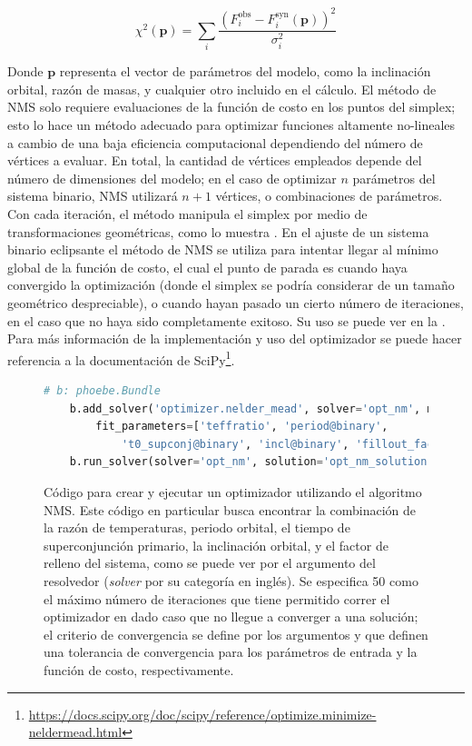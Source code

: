 \begin{eqfloat}[!ht]
	\centering
	\begin{equation}
		\chi^2(\textbf{p}) = \sum_{i}{\frac{\left(F_{i}^{\textrm{obs}} - F^{\textrm{syn}}_i(\textbf{p})\right)^2}{\sigma_{i}^2}}
	\end{equation}
	\blankcaption
	\label{ecuacionChi2Params}
\end{eqfloat}

Donde $\mathbf{p}$ representa el vector de parámetros del modelo, como la
inclinación orbital, razón de masas, y cualquier otro incluido en el cálculo. El
método de NMS solo requiere evaluaciones de la función de costo en los puntos
del simplex; esto lo hace un método adecuado para optimizar funciones altamente
no-lineales a cambio de una baja eficiencia computacional 
dependiendo del número de vértices a evaluar. En total, la cantidad
de vértices empleados depende del número de dimensiones del modelo; en el caso
de optimizar $n$ parámetros del sistema binario, NMS utilizará $n+1$ vértices, o
combinaciones de parámetros. Con cada iteración, el método manipula el simplex
por medio de transformaciones geométricas, como lo muestra
. En el ajuste de un sistema
binario eclipsante el método de NMS se utiliza para intentar llegar al mínimo
global de la función de costo, el cual el punto de parada es cuando haya
convergido la optimización (donde el simplex se podría considerar de un tamaño
geométrico despreciable), o cuando hayan pasado un cierto número de iteraciones,
en el caso que no haya sido completamente exitoso. Su uso se puede ver en la
. Para más información de la implementación y uso
del optimizador se puede hacer referencia a la documentación de
SciPy\footnote{\url{https://docs.scipy.org/doc/scipy/reference/optimize.minimize-neldermead.html}}.

\begin{figure}[!ht]
	\centering
	\begin{lstlisting}[language=Python, autogobble]
	# b: phoebe.Bundle
	b.add_solver('optimizer.nelder_mead', solver='opt_nm', maxiter=50,
		fit_parameters=['teffratio', 'period@binary', 
			't0_supconj@binary', 'incl@binary', 'fillout_factor'])
	b.run_solver(solver='opt_nm', solution='opt_nm_solution')
	\end{lstlisting}
	\caption{Código para crear y ejecutar un optimizador utilizando el algoritmo
	NMS. Este código en particular busca encontrar la combinación de la razón de
	temperaturas, periodo orbital, el tiempo de superconjunción primario, la
	inclinación orbital, y el factor de relleno del sistema, como se puede ver
	por el argumento  del resolvedor (\textit{solver} por
	su categoría en inglés). Se especifica 50 como el máximo número de
	iteraciones que tiene permitido correr el optimizador en dado caso que no
	llegue a converger a una solución; el criterio de convergencia se define por
	los argumentos  y  que definen una tolerancia de
	convergencia para los parámetros de entrada y la función de costo,
	respectivamente.}
	\label{codigoOptimizadorNMS}
\end{figure}

